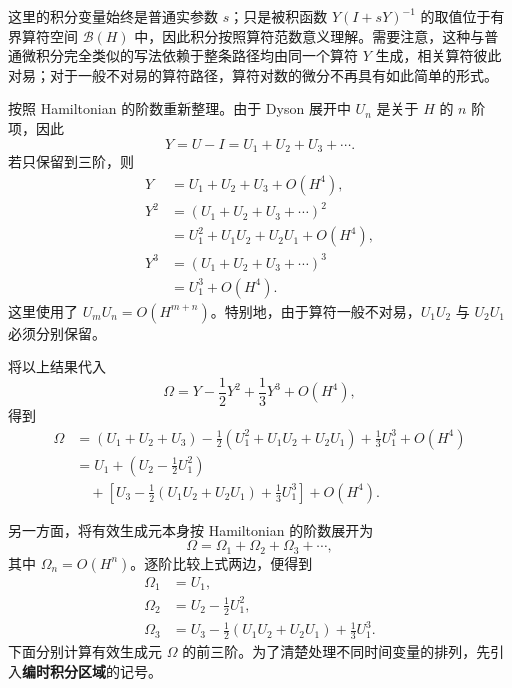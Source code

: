 \documentclass[UTF8,a4paper,11pt,openany]{ctexbook}
\begin{document}
这里的积分变量始终是普通实参数 $s$；只是被积函数
$Y(I+sY)^{-1}$ 的取值位于有界算符空间 $\mathcal B(H)$ 中，因此积分按照算符范数意义理解。需要注意，这种与普通微积分完全类似的写法依赖于整条路径均由同一个算符 $Y$ 生成，相关算符彼此对易；对于一般不对易的算符路径，算符对数的微分不再具有如此简单的形式。


按照 Hamiltonian 的阶数重新整理。由于 Dyson 展开中
$U_n$ 是关于 $H$ 的 $n$ 阶项，因此
\[
Y
=
U-I
=
U_1+U_2+U_3+\cdots.
\]
若只保留到三阶，则
\begin{align}
    Y
    &=
    U_1+U_2+U_3+O(H^4),
    \nonumber\\
    Y^2
    &=
    (U_1+U_2+U_3+\cdots)^2
    \nonumber\\
    &=
    U_1^2
    +U_1U_2
    +U_2U_1
    +O(H^4),
    \nonumber\\
    Y^3
    &=
    (U_1+U_2+U_3+\cdots)^3
    \nonumber\\
    &=
    U_1^3+O(H^4).
\end{align}
这里使用了
$U_mU_n=O(H^{m+n})$。特别地，由于算符一般不对易，$U_1U_2$ 与 $U_2U_1$ 必须分别保留。

将以上结果代入
\[
\Omega
=
Y-\frac12Y^2+\frac13Y^3+O(H^4),
\]
得到
\begin{align}
    \Omega
    &=
    \left(U_1+U_2+U_3\right)
    -\frac12
    \left(
        U_1^2+U_1U_2+U_2U_1
    \right)
    +\frac13U_1^3
    +O(H^4)
    \nonumber\\
    &=
    U_1
    +
    \left(
        U_2-\frac12U_1^2
    \right)
    \nonumber\\
    &\quad+
    \left[
        U_3
        -\frac12
        \left(
            U_1U_2+U_2U_1
        \right)
        +\frac13U_1^3
    \right]
    +O(H^4).
\end{align}

另一方面，将有效生成元本身按 Hamiltonian 的阶数展开为
\begin{equation}
    \Omega
    =
    \Omega_1+\Omega_2+\Omega_3+\cdots,
\end{equation}
其中 $\Omega_n=O(H^n)$。逐阶比较上式两边，便得到
\begin{align}
    \Omega_1
    &=U_1,
    \nonumber\\
    \Omega_2
    &=U_2-\frac12U_1^2,
    \nonumber\\
    \Omega_3
    &=
    U_3
    -\frac12
    \left(
        U_1U_2+U_2U_1
    \right)
    +\frac13U_1^3.
\end{align}
下面分别计算有效生成元 $\Omega$ 的前三阶。为了清楚处理不同时间变量的排列，先引入\textbf{编时积分区域}的记号。
\end{document}

